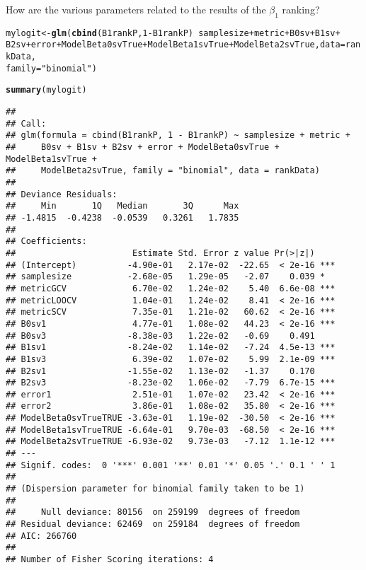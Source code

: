 \documentclass{article}\usepackage[]{graphicx}\usepackage[]{color}
\makeatletter
\newcommand{\hlnum}[1]{\textcolor[rgb]{0.686,0.059,0.569}{#1}}%
\newcommand{\hlstr}[1]{\textcolor[rgb]{0.192,0.494,0.8}{#1}}%
\newcommand{\hlopt}[1]{\textcolor[rgb]{0,0,0}{#1}}%
\newcommand{\hlstd}[1]{\textcolor[rgb]{0.345,0.345,0.345}{#1}}%
\newcommand{\hlkwb}[1]{\textcolor[rgb]{0.69,0.353,0.396}{#1}}%
\newcommand{\hlkwc}[1]{\textcolor[rgb]{0.333,0.667,0.333}{#1}}%
\newcommand{\hlkwd}[1]{\textcolor[rgb]{0.737,0.353,0.396}{\textbf{#1}}}%
\newenvironment{kframe}{%
 \def\at@end@of@kframe{}%
 \ifinner\ifhmode%
  \def\at@end@of@kframe{\end{minipage}}%
  \begin{minipage}{\columnwidth}%
 \fi\fi%
 \def\FrameCommand##1{\hskip\@totalleftmargin \hskip-\fboxsep
 \colorbox{shadecolor}{##1}\hskip-\fboxsep
     \hskip-\linewidth \hskip-\@totalleftmargin \hskip\columnwidth}%
 \MakeFramed {\advance\hsize-\width
   \@totalleftmargin\z@ \linewidth\hsize
   \@setminipage}}%
 {\par\unskip\endMakeFramed%
 \at@end@of@kframe}
\newenvironment{knitrout}{}{} %
\makeatother
\begin{document}
How are the various parameters related to the results of the $\beta _1$ ranking?
\begin{knitrout}
\color{fgcolor}\begin{kframe}
\begin{alltt}
\hlstd{mylogit} \hlkwb{<-} \hlkwd{glm}\hlstd{(}\hlkwd{cbind}\hlstd{(B1rankP,} \hlnum{1} \hlopt{-} \hlstd{B1rankP)} \hlopt{~} \hlstd{samplesize} \hlopt{+} \hlstd{metric} \hlopt{+} \hlstd{B0sv} \hlopt{+} \hlstd{B1sv} \hlopt{+}
    \hlstd{B2sv} \hlopt{+} \hlstd{error} \hlopt{+} \hlstd{ModelBeta0svTrue} \hlopt{+} \hlstd{ModelBeta1svTrue} \hlopt{+} \hlstd{ModelBeta2svTrue,} \hlkwc{data} \hlstd{= rankData,}
    \hlkwc{family} \hlstd{=} \hlstr{"binomial"}\hlstd{)}
\end{alltt}


{\ttfamily\noindent\color{warningcolor}{\#\# Warning: non-integer counts in a binomial glm!}}\begin{alltt}
\hlkwd{summary}\hlstd{(mylogit)}
\end{alltt}
\begin{verbatim}
## 
## Call:
## glm(formula = cbind(B1rankP, 1 - B1rankP) ~ samplesize + metric + 
##     B0sv + B1sv + B2sv + error + ModelBeta0svTrue + ModelBeta1svTrue + 
##     ModelBeta2svTrue, family = "binomial", data = rankData)
## 
## Deviance Residuals: 
##     Min       1Q   Median       3Q      Max  
## -1.4815  -0.4238  -0.0539   0.3261   1.7835  
## 
## Coefficients:
##                       Estimate Std. Error z value Pr(>|z|)    
## (Intercept)          -4.90e-01   2.17e-02  -22.65  < 2e-16 ***
## samplesize           -2.68e-05   1.29e-05   -2.07    0.039 *  
## metricGCV             6.70e-02   1.24e-02    5.40  6.6e-08 ***
## metricLOOCV           1.04e-01   1.24e-02    8.41  < 2e-16 ***
## metricSCV             7.35e-01   1.21e-02   60.62  < 2e-16 ***
## B0sv1                 4.77e-01   1.08e-02   44.23  < 2e-16 ***
## B0sv3                -8.38e-03   1.22e-02   -0.69    0.491    
## B1sv1                -8.24e-02   1.14e-02   -7.24  4.5e-13 ***
## B1sv3                 6.39e-02   1.07e-02    5.99  2.1e-09 ***
## B2sv1                -1.55e-02   1.13e-02   -1.37    0.170    
## B2sv3                -8.23e-02   1.06e-02   -7.79  6.7e-15 ***
## error1                2.51e-01   1.07e-02   23.42  < 2e-16 ***
## error2                3.86e-01   1.08e-02   35.80  < 2e-16 ***
## ModelBeta0svTrueTRUE -3.63e-01   1.19e-02  -30.50  < 2e-16 ***
## ModelBeta1svTrueTRUE -6.64e-01   9.70e-03  -68.50  < 2e-16 ***
## ModelBeta2svTrueTRUE -6.93e-02   9.73e-03   -7.12  1.1e-12 ***
## ---
## Signif. codes:  0 '***' 0.001 '**' 0.01 '*' 0.05 '.' 0.1 ' ' 1
## 
## (Dispersion parameter for binomial family taken to be 1)
## 
##     Null deviance: 80156  on 259199  degrees of freedom
## Residual deviance: 62469  on 259184  degrees of freedom
## AIC: 266760
## 
## Number of Fisher Scoring iterations: 4
\end{verbatim}
\end{kframe}
\end{knitrout}
\end{document}
